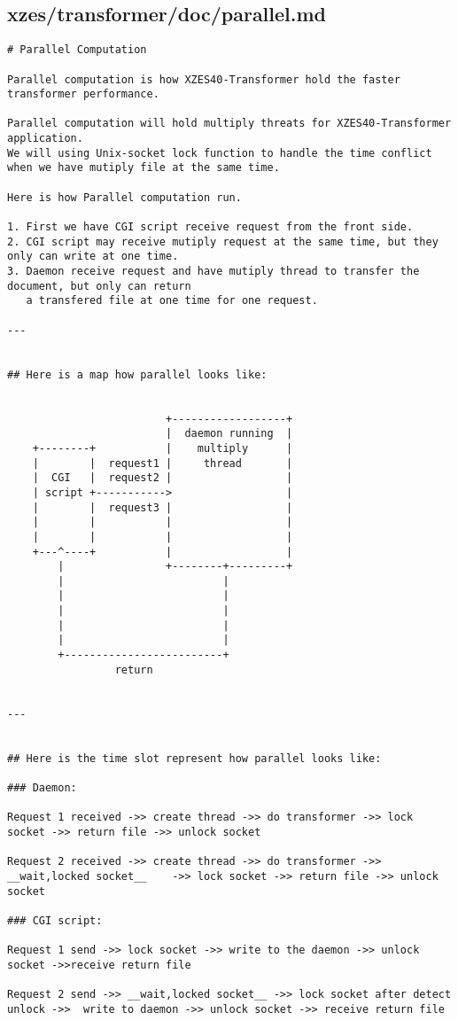 \subsection{xzes/transformer/doc/parallel.md}
\begin{lstlisting}[caption={Documentation about the parallel transformation code.}]
# Parallel Computation

Parallel computation is how XZES40-Transformer hold the faster transformer performance.

Parallel computation will hold multiply threats for XZES40-Transformer application.
We will using Unix-socket lock function to handle the time conflict when we have mutiply file at the same time.

Here is how Parallel computation run.

1. First we have CGI script receive request from the front side.
2. CGI script may receive mutiply request at the same time, but they only can write at one time.
3. Daemon receive request and have mutiply thread to transfer the document, but only can return
   a transfered file at one time for one request. 

---


## Here is a map how parallel looks like:


                         +------------------+
                         |  daemon running  |
    +--------+           |    multiply      |
    |        |  request1 |     thread       |
    |  CGI   |  request2 |                  |
    | script +----------->                  |
    |        |  request3 |                  |
    |        |           |                  |
    |        |           |                  |
    +---^----+           |                  |
        |                +--------+---------+
        |                         |
        |                         |
        |                         |
        |                         |
        |                         |
        +-------------------------+
                 return


---


## Here is the time slot represent how parallel looks like:

### Daemon:

Request 1 received ->> create thread ->> do transformer ->> lock socket ->> return file ->> unlock socket

Request 2 received ->> create thread ->> do transformer ->>   __wait,locked socket__    ->> lock socket ->> return file ->> unlock socket

### CGI script:

Request 1 send ->> lock socket ->> write to the daemon ->> unlock socket ->>receive return file

Request 2 send ->> __wait,locked socket__ ->> lock socket after detect unlock ->>  write to daemon ->> unlock socket ->> receive return file
\end{lstlisting}
